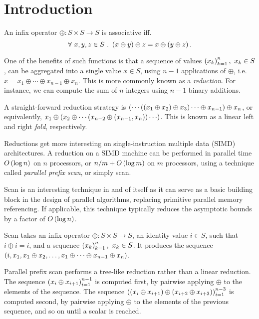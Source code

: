 \section{Introduction}

An infix operator $\oplus:S\times S\rightarrow S$ is associative iff.
\[\forall\ x,y,z\in S\ .\ \p{x \oplus y} \oplus z = x \oplus \p{y \oplus z}.\]

One of the benefits of such functions is that a sequence of values
$\left({x_k}\right)_{k=1}^n,\ x_k\in S$, can be aggregated into a single value $x\in S$,
using $n-1$ applications of $\oplus$, i.e. $x = x_1 \oplus \cdots \oplus
x_{n-1} \oplus x_n$. This is more commonly known as a \emph{reduction}.  For
instance, we can compute the sum of $n$ integers using $n-1$ binary additions.

A straight-forward reduction strategy is $\left({\cdots \left({\left({x_1 \oplus x_2}\right)
\oplus x_3}\right) \cdots \oplus x_{n-1}}\right) \oplus x_n$, or equivalently, $x_1 \oplus
\left({x_2 \oplus \cdots \left({x_{n-2} \oplus \left({x_{n-1}, x_n}\right)}\right) \cdots }\right)$.  This is
known as a linear left and right \emph{fold}, respectively.

Reductions get more interesting on single-instruction multiple data (SIMD)
architectures. A reduction on a SIMD machine can be performed in parallel time
$O\left({\log n}\right)$ on $n$ processors, or ${n/m}+O\left({\log m}\right)$ on $m$ processors,
using a technique called \emph{parallel prefix scan}, or simply scan.

Scan is an interesting technique in and of itself as it can serve as a basic
building block in the design of parallel algorithms, replacing primitive
parallel memory referencing. If applicable, this technique typically reduces
the asymptotic bounds by a factor of $O\left({\log n}\right)$\cite{blelloch}.

Scan takes an infix operator $\oplus:S\times S\rightarrow S$, an identity value
$i\in S$, such that $i\oplus i = i$, and a sequence $\left({x_k}\right)_{k=1}^n,\ x_k\in
S$.  It produces the sequence $\left({i, x_1, x_1 \oplus x_2, \ldots, x_1 \oplus
\cdots \oplus x_{n-1} \oplus x_n}\right)$.

Parallel prefix scan performs a tree-like reduction rather than a linear
reduction. The sequence $\left({x_i \oplus x_{i+1}}\right)_{i=1}^{n-1}$ is computed first,
by pairwise applying $\oplus$ to the elements of the sequence. The sequence
$\left({\left({x_i \oplus x_{i+1}}\right) \oplus \left({x_{i+2} \oplus x_{i+3}}\right)}\right)_{i=1}^{n-3}$ is
computed second, by pairwise applying $\oplus$ to the elements of the previous
sequence, and so on until a scalar is reached.


